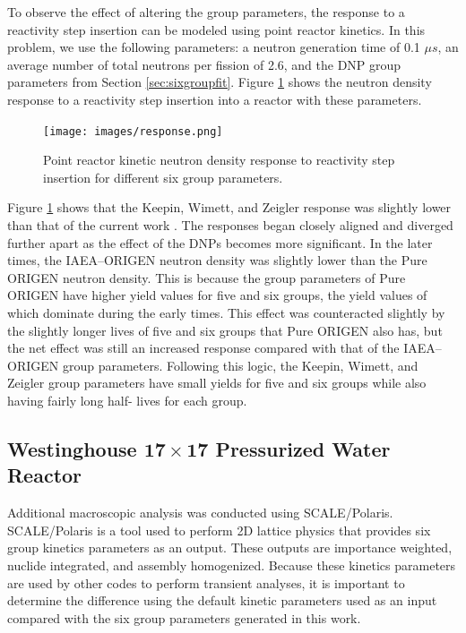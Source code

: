 \documentclass{style/nseJournal}
\begin{document}
To observe the effect of altering the group parameters, the response to a reactivity step insertion can be modeled using point reactor kinetics.
In this problem, we use the following parameters: a neutron generation time of 0.1 $\mu s$, an average number of total neutrons per fission of 2.6, and the DNP group parameters from Section \ref{sec:sixgroupfit}.
Figure \ref{fig:PRK-resp} shows the neutron density response to a reactivity step insertion into a reactor with these parameters.

\begin{figure}[]
\centering
\texttt{[image: images/response.png]}
\caption{Point reactor kinetic neutron density response to reactivity step insertion for different six group parameters.}
\label{fig:PRK-resp}
\end{figure}

Figure \ref{fig:PRK-resp} shows that the Keepin, Wimett, and Zeigler response was slightly lower than that of the current work \cite{KEEPIN1957IN2}. The responses began closely aligned and diverged further apart as the effect of the DNPs becomes more significant. In the later times, the IAEA--ORIGEN neutron density was slightly lower than the Pure ORIGEN neutron density. This is because the group parameters of Pure ORIGEN have higher yield values for five and six groups, the yield values of which dominate during the early times. This effect was counteracted slightly by the slightly longer lives of five and six groups that Pure ORIGEN also has, but the net effect was still an increased response compared with that of the IAEA--ORIGEN group parameters. Following this logic, the Keepin, Wimett, and Zeigler group parameters have small yields for five and six groups while also having fairly long half- lives for each group.

\subsection{Westinghouse $\mathbf{17\times17}$ Pressurized Water Reactor}

Additional macroscopic analysis was conducted using SCALE/Polaris. SCALE/Polaris is a tool used to perform 2D lattice physics that provides six group kinetics parameters as an output. These outputs are importance weighted, nuclide integrated, and assembly homogenized.
Because these kinetics parameters are used by other codes to perform transient analyses, it is important to determine the difference using the default kinetic parameters used as an input compared with the six group parameters generated in this work.
\end{document}
